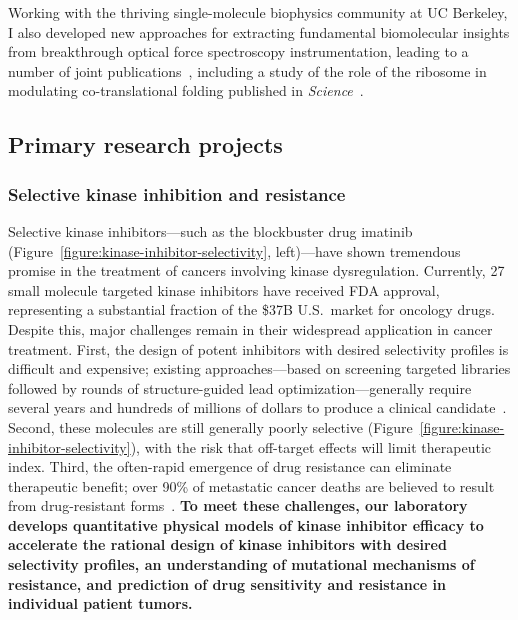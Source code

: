 \documentclass[10pt]{article}
\begin{document}
Working with the thriving single-molecule biophysics community at UC Berkeley, I also developed new approaches for extracting fundamental biomolecular insights from breakthrough optical force spectroscopy instrumentation, leading to a number of joint publications~\cite{elms:biophys-j:2012:constant-force-feedback,elms:pnas:2012:molten-globule,chodera:2011:rate-theory,bhmm}, including a study of the role of the ribosome in modulating co-translational folding published in \emph{Science}~\cite{kaiser:2011:ribosome-folding}.

\eject

\subsection*{Primary research projects}

\vspace{-0.3cm}
\subsubsection*{Selective kinase inhibition and resistance}
\vspace{-0.3cm}

Selective kinase inhibitors---such as the blockbuster drug imatinib (Figure~\ref{figure:kinase-inhibitor-selectivity}, left)---have shown tremendous promise in the treatment of cancers involving kinase dysregulation.
Currently, 27 small molecule targeted kinase inhibitors have received FDA approval, representing a substantial fraction of the \$37B U.S.~market for oncology drugs.
Despite this, major challenges remain in their widespread application in cancer treatment.
First, the design of potent inhibitors with desired selectivity profiles is difficult and expensive; existing approaches---based on screening targeted libraries followed by rounds of structure-guided lead optimization---generally require several years and hundreds of millions of dollars to produce a clinical candidate~\cite{paul:2010:nrdd:pharma-research-development}.
Second, these molecules are still generally poorly selective (Figure~\ref{figure:kinase-inhibitor-selectivity}), with the risk that off-target effects will limit therapeutic index.
Third, the often-rapid emergence of drug resistance can eliminate therapeutic benefit; over 90\% of metastatic cancer deaths are believed to result from drug-resistant forms~\cite{longley-johnston:j-pathol:2005:drug-resistance}.
{\bf To meet these challenges, our laboratory develops quantitative physical models of kinase inhibitor efficacy to accelerate the rational design of kinase inhibitors with desired selectivity profiles, an understanding of mutational mechanisms of resistance, and prediction of drug sensitivity and resistance in individual patient tumors.}
\end{document}
